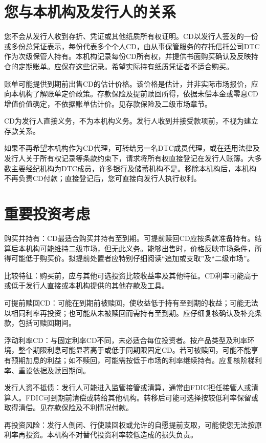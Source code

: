 \documentclass[UTF8,fontset=none,11pt,a4paper]{ctexart}
\begin{document}
\section*{您与本机构及发行人的关系}
您不会从发行人收到存折、凭证或其他纸质所有权证明。CD以发行人签发的一份或多份总凭证表示，每份代表多个个人CD，由从事保管服务的存托信托公司DTC作为次级保管人持有。本机构记录每份CD所有权，并提供书面购买确认及反映持仓的定期账单。应保存这些记录。希望实际持有纸质凭证者不适合购买。


账单可能提供到期前出售CD的估计价格。该价格是估计，并非实际市场报价，应向本机构了解账单定价政策。存款保险及提前赎回所得，依据未偿本金或零息CD增值价值确定，不依据账单估计价。见存款保险及二级市场章节。


CD为发行人直接义务，不为本机构义务。发行人收到并接受款项前，不视为建立存款关系。


如果不再希望本机构作为CD代理，可转给另一名DTC成员代理，或在适用法律及发行人关于所有权记录等条款约束下，请求将所有权直接登记在发行人账簿。大多数主要经纪机构为DTC成员，许多银行及储蓄机构不是。移除本机构后，本机构不再负责CD付款；直接登记后，您可直接向发行人执行权利。


\section*{重要投资考虑}
购买并持有：CD最适合购买并持有至到期。可提前赎回CD应按条款准备持有。结算后本机构可能维持二级市场，但无此义务。能够出售时，价格反映市场条件，所得可能低于购买价。拟提前处置者应特别仔细阅读“追加或支取”及“二级市场”。


比较特征：购买前，应与其他可选投资比较收益率及其他特征。CD利率可能高于或低于发行人直接或本机构提供的其他存款及工具。


可提前赎回CD：可能在到期前被赎回，使收益低于持有至到期的收益；可能无法以相同利率再投资；也可能从未被赎回而需持有至到期。应仔细复核确认及补充条款，包括可赎回期间。


浮动利率CD：与固定利率CD不同，未必适合每位投资者。按产品类型及利率环境，整个期限利息可能显著高于或低于同期限固定CD。若可被赎回，可能不能享有预期加息的利益；如不赎回，可能需按低于市场的利率继续持有。应复核阶梯利率、重设依据及赎回期间。


发行人资不抵债：发行人可能进入监管接管或清算，通常由FDIC担任接管人或清算人。FDIC可到期前清偿或转给其他机构。转移后可能可选择按较低利率保留或取得清偿。见存款保险及不利情况付款。


再投资风险：发行人倒闭、行使赎回权或允许的自愿提前支取，可能使您无法按原利率再投资。本机构不对替代投资利率较低造成的损失负责。
\end{document}
